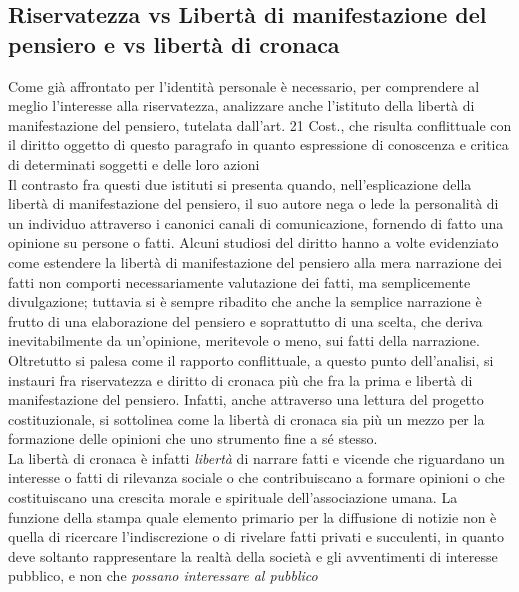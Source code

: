 \subsection{Riservatezza vs Libertà di manifestazione del pensiero e vs libertà di cronaca}%
Come già affrontato per l'identità personale è necessario, per comprendere al meglio l'interesse alla riservatezza, analizzare anche l'istituto della libertà di manifestazione del pensiero, tutelata dall'art. 21 Cost., che risulta conflittuale con il diritto oggetto di questo paragrafo in quanto espressione di conoscenza e critica di determinati soggetti e delle loro azioni
\\Il contrasto fra questi due istituti si presenta quando, nell'esplicazione della libertà di manifestazione del pensiero, il suo autore nega o lede la personalità di un individuo attraverso i canonici canali di comunicazione, fornendo di fatto una opinione su persone o fatti. Alcuni studiosi del diritto hanno a volte evidenziato come estendere la libertà di manifestazione del pensiero alla mera narrazione dei fatti non comporti necessariamente valutazione dei fatti, ma semplicemente divulgazione; tuttavia si è sempre ribadito che anche la semplice narrazione è frutto di una elaborazione del pensiero e soprattutto di una scelta, che deriva inevitabilmente da un'opinione, meritevole o meno, sui fatti della narrazione. Oltretutto si palesa come il rapporto conflittuale, a questo punto dell'analisi, si instauri fra riservatezza e diritto di cronaca più che fra la prima e libertà di manifestazione del pensiero.
Infatti, anche attraverso una lettura del progetto costituzionale, si sottolinea come la libertà di cronaca sia più un mezzo per la formazione delle opinioni che uno strumento fine a sé stesso.
\\La libertà di cronaca è infatti \textit{libertà} di narrare fatti e vicende che riguardano un interesse o fatti di rilevanza sociale o che contribuiscano a formare opinioni o che costituiscano una crescita morale e spirituale dell'associazione umana.
La funzione della stampa quale elemento primario per la diffusione di notizie non è quella di ricercare l'indiscrezione o di rivelare fatti privati e succulenti, in quanto deve soltanto rappresentare la realtà della società e gli avventimenti di interesse pubblico, e non che \textit{possano interessare al pubblico}
